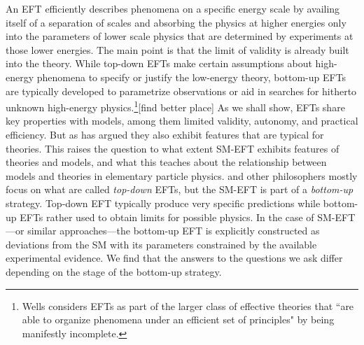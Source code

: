 
An EFT efficiently describes phenomena on a specific energy scale by availing itself of a separation of scales and absorbing the physics at higher energies only into the parameters of lower scale physics that are determined by experiments at those lower energies. 
The main point is that the limit of validity is already built into the theory. 
While top-down EFTs make certain assumptions about high-energy phenomena to specify or justify the low-energy theory, bottom-up EFTs are typically developed to parametrize observations or aid in searches for hitherto unknown high-energy physics.\footnote{Wells considers EFTs as part of the larger class of effective theories that ``are able to organize phenomena under an efficient set of principles" \citep[p.~1]{wells2012} by being manifestly incomplete.}[find better place]
As we shall show, EFTs share key properties with models, among them limited validity, autonomy, and practical efficiency. 
But as \citet{hartmann2001} has argued they also exhibit features that are typical for theories. 
This raises the question to what extent SM-EFT exhibits features of theories and models, and what this teaches about the relationship between models and theories in elementary particle physics.
\citet{hartmann2001} and other philosophers mostly focus on what are called \textit{top-down} EFTs, but the SM-EFT is part of a \textit{bottom-up} strategy.
Top-down EFT typically produce very specific predictions while bottom-up EFTs rather used to obtain limits for possible physics. 
In the case of SM-EFT---or similar approaches---the bottom-up EFT is explicitly constructed as deviations from the SM with its parameters constrained by the available experimental evidence. 
We find that the answers to the questions we ask differ depending on the stage of the bottom-up strategy.


